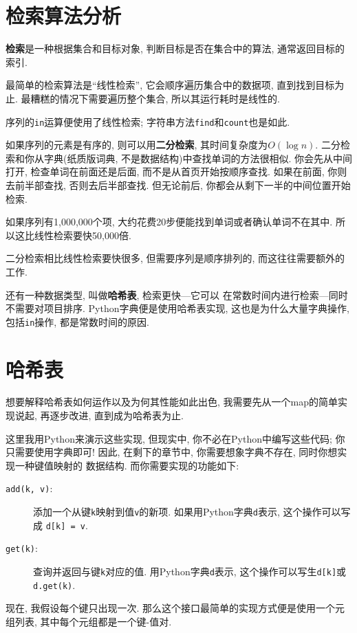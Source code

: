\documentclass[10pt]{book}
\begin{document}
\section{检索算法分析}

{\bf 检索}是一种根据集合和目标对象, 判断目标是否在集合中的算法, 
通常返回目标的索引. 

最简单的检索算法是``线性检索'', 它会顺序遍历集合中的数据项, 直到找到目标为止. 
最糟糕的情况下需要遍历整个集合, 所以其运行耗时是线性的.

序列的{\tt in}运算便使用了线性检索;
字符串方法{\tt find}和{\tt count}也是如此.

如果序列的元素是有序的, 则可以用{\bf 二分检索}, 其时间复杂度为$O(\log n)$. 
二分检索和你从字典(纸质版词典, 不是数据结构)中查找单词的方法很相似. 
你会先从中间打开, 检查单词在前面还是后面, 而不是从首页开始按顺序查找. 
如果在前面, 你则去前半部查找, 否则去后半部查找. 
但无论前后, 你都会从剩下一半的中间位置开始检索. 

如果序列有1,000,000个项, 大约花费20步便能找到单词或者确认单词不在其中. 
所以这比线性检索要快50,000倍. 

二分检索相比线性检索要快很多, 但需要序列是顺序排列的, 
而这往往需要额外的工作. 

还有一种数据类型, 叫做{\bf 哈希表}, 检索更快---它可以
在常数时间内进行检索---同时不需要对项目排序. 
Python字典便是使用哈希表实现, 这也是为什么大量字典操作, 包括{\tt in}操作, 
都是常数时间的原因. 


\section{哈希表}
\label{hashtable}

想要解释哈希表如何运作以及为何其性能如此出色, 
我需要先从一个map的简单实现说起, 
再逐步改进, 直到成为哈希表为止. 

这里我用Python来演示这些实现, 但现实中, 你不必在Python中编写这些代码; 
你只需要使用字典即可!
因此, 在剩下的章节中, 你需要想象字典不存在, 同时你想实现一种键值映射的
数据结构. 而你需要实现的功能如下:

\begin{description}

\item[{\tt add(k, v)}:] 添加一个从键{\tt k}映射到值{\tt v}的新项.
如果用Python字典{\tt d}表示, 这个操作可以写成 {\tt d[k] = v}.

\item[{\tt get(k)}:] 查询并返回与键{\tt k}对应的值.
用Python字典{\tt d}表示, 这个操作可以写生{\tt d[k]}或{\tt d.get(k)}.

\end{description}
现在, 我假设每个键只出现一次.
那么这个接口最简单的实现方式便是使用一个元组列表,
其中每个元组都是一个键-值对.
\end{document}

